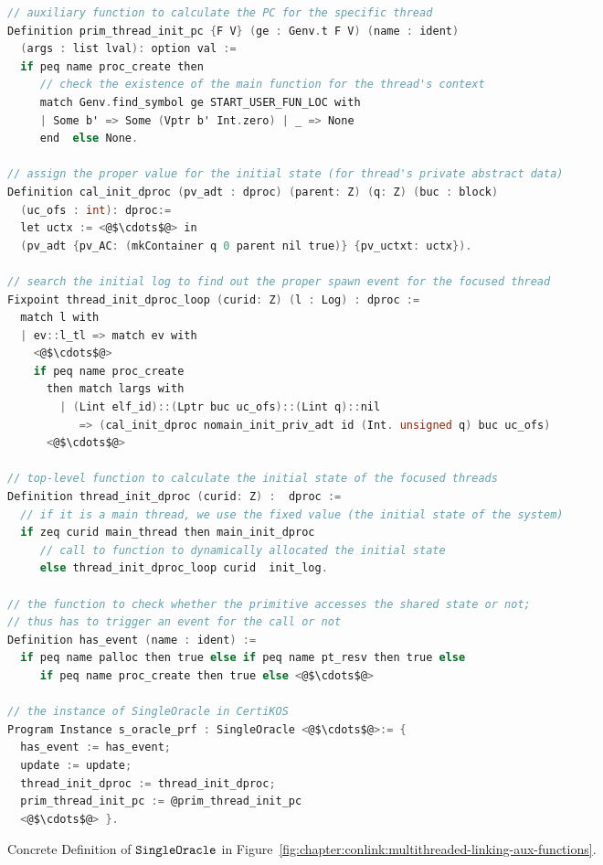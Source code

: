 \begin{figure}
\begin{lstlisting}[language=C, deletekeywords={int}]
// auxiliary function to calculate the PC for the specific thread
Definition prim_thread_init_pc {F V} (ge : Genv.t F V) (name : ident) 
  (args : list lval): option val :=
  if peq name proc_create then 
     // check the existence of the main function for the thread's context
     match Genv.find_symbol ge START_USER_FUN_LOC with
     | Some b' => Some (Vptr b' Int.zero) | _ => None
     end  else None.

// assign the proper value for the initial state (for thread's private abstract data)
Definition cal_init_dproc (pv_adt : dproc) (parent: Z) (q: Z) (buc : block) 
  (uc_ofs : int): dproc:= 
  let uctx := <@$\cdots$@> in 
  (pv_adt {pv_AC: (mkContainer q 0 parent nil true)} {pv_uctxt: uctx}).

// search the initial log to find out the proper spawn event for the focused thread
Fixpoint thread_init_dproc_loop (curid: Z) (l : Log) : dproc :=
  match l with 
  | ev::l_tl => match ev with 
    <@$\cdots$@>
    if peq name proc_create
      then match largs with
        | (Lint elf_id)::(Lptr buc uc_ofs)::(Lint q)::nil
           => (cal_init_dproc nomain_init_priv_adt id (Int. unsigned q) buc uc_ofs)
      <@$\cdots$@>

// top-level function to calculate the initial state of the focused threads
Definition thread_init_dproc (curid: Z) :  dproc :=
  // if it is a main thread, we use the fixed value (the initial state of the system)
  if zeq curid main_thread then main_init_dproc 
     // call to function to dynamically allocated the initial state
     else thread_init_dproc_loop curid  init_log.
     
// the function to check whether the primitive accesses the shared state or not;
// thus has to trigger an event for the call or not 
Definition has_event (name : ident) :=
  if peq name palloc then true else if peq name pt_resv then true else
     if peq name proc_create then true else <@$\cdots$@>
 
// the instance of SingleOracle in CertiKOS 
Program Instance s_oracle_prf : SingleOracle <@$\cdots$@>:= { 
  has_event := has_event;
  update := update;
  thread_init_dproc := thread_init_dproc;
  prim_thread_init_pc := @prim_thread_init_pc
  <@$\cdots$@> }.
\end{lstlisting}
\caption{Concrete Definition of ${\mathrm{\texttt{SingleOracle}}}$ in Figure~\ref{fig:chapter:conlink:multithreaded-linking-aux-functions}.}
\label{fig:chapter:certikos:auxfunctions-of-multithreaded-linking-certikos}
\end{figure}

